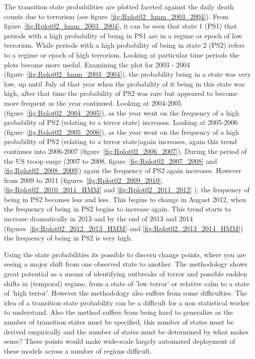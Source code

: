 The transition state probabilities are plotted faceted against the daily death counts due to terrorism (see figure~\ref{fig:Rplot02_hmm_2003_2004}). From figure~\ref{fig:Rplot02_hmm_2003_2004}, it can be seen that state 1 (PS1) that periods with a high probability of being in PS1 are in a regime or epoch of low terrorism. While periods with a high probability of being in state 2 (PS2) refers to a  regime or epoch of high terrorism. Looking at particular time periods the plots become more useful. Examining the plot for 2003 - 2004 (figure~\ref{fig:Rplot02_hmm_2003_2004}), the probability being in a state was very low, up until July of that year when the probability of it being in this state was high, after that time the probability of PS2 was rare but appeared to become more frequent as the year continued. Looking at 2004-2005 (figure~\ref{fig:Rplot02_2004_2005}), as the year went on the frequency of a high probability of PS2 (relating to a terror state) increases. Looking at 2005-2006 (figure~\ref{fig:Rplot02_2005_2006}), as the year went on the frequency of a high probability of PS2 (relating to a terror state)again increases, again this trend continues into 2006-2007 (figure~\ref{fig:Rplot02_2006_2007}). During the period of the US troop surge (2007 to 2008, figure~\ref{fig:Rplot02_2007_2008} and \ref{fig:Rplot02_2008_2009}) again the frequency of PS2 again increases. However  from 2009 to 2011 (figures~\ref{fig:Rplot02_2009_2010}, \ref{fig:Rplot02_2010_2011_HMM} and \ref{fig:Rplot02_2011_2012} ), the frequency of being in PS2 becomes less and less. This begins to change in August 2012, when the frequency of being in PS2 begins to increase again. This trend starts to increase dramatically  in 2013 and by the end of 2013 and 2014 (figures~\ref{fig:Rplot02_2012_2013_HMM} and \ref{fig:Rplot02_2013_2014_HMM})  the frequency of being in PS2 is very high.  

Using the state probabilities its possible to discern change points, where you are seeing a major shift from one observed state to another. The methodology shows great potential as a means of identifying outbreaks of terror and possible sudden shifts in (temporal) regime, from a state of 'low terror' or relative calm to a state of 'high terror'. However the methodology also suffers from some difficulties. The idea of a transition state probability can be a difficult for a non statistical worker to understand. Also the method suffers from being hard to generalize as the number of transition states must be specified, this number of states must be derived empirically and the number of states must be determined by what makes sense? These points would make wide-scale largely automated deployment of these models across a number of regions difficult. 

